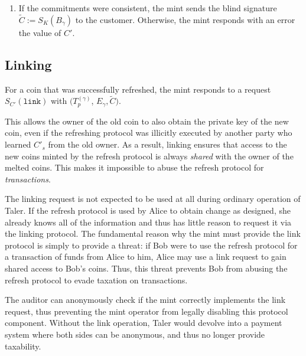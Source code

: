 \documentclass{llncs}
\begin{document}
\begin{enumerate}
  \item \label{step:refresh-done} If the commitments were consistent,
    the mint sends the blind signature $\widetilde{C} :=
    S_{K}(B_\gamma)$ to the customer.  Otherwise, the mint responds
    with an error the value of $C'$.
\end{enumerate}

%

\subsection{Linking}

For a coin that was successfully refreshed, the mint responds to a
request $S_{C'}(\mathtt{link})$ with $(T^{(\gamma)}_p$, $E_{\gamma},
\widetilde{C})$.

This allows the owner of the old coin to also obtain the private key
of the new coin, even if the refreshing protocol was illicitly
executed by another party who learned $C'_s$ from the old owner.  As a
result, linking ensures that access to the new coins minted by the
refresh protocol is always {\em shared} with the owner of the melted
coins.  This makes it impossible to abuse the refresh protocol for
{\em transactions}.

The linking request is not expected to be used at all during ordinary
operation of Taler.  If the refresh protocol is used by Alice to
obtain change as designed, she already knows all of the information
and thus has little reason to request it via the linking protocol.
The fundamental reason why the mint must provide the link protocol is
simply to provide a threat: if Bob were to use the refresh protocol
for a transaction of funds from Alice to him, Alice may use a link
request to gain shared access to Bob's coins. Thus, this threat
prevents Bob from abusing the refresh protocol to evade taxation on
transactions.

The auditor can anonymously check if the mint correctly implements the
link request, thus preventing the mint operator from legally disabling
this protocol component.  Without the link operation, Taler would
devolve into a payment system where both sides can be anonymous, and
thus no longer provide taxability.
\end{document}
